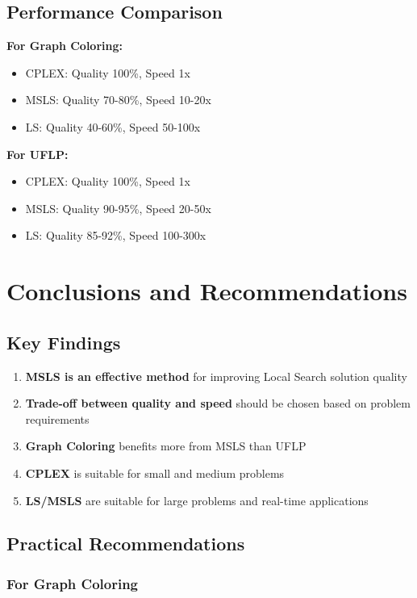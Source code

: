 \documentclass[12pt,a4paper]{article}
\begin{document}
\subsection{Performance Comparison}

\textbf{For Graph Coloring:}
\begin{itemize}
    \item CPLEX: Quality 100\%, Speed 1x
    \item MSLS: Quality 70-80\%, Speed 10-20x
    \item LS: Quality 40-60\%, Speed 50-100x
\end{itemize}

\textbf{For UFLP:}
\begin{itemize}
    \item CPLEX: Quality 100\%, Speed 1x
    \item MSLS: Quality 90-95\%, Speed 20-50x
    \item LS: Quality 85-92\%, Speed 100-300x
\end{itemize}

\section{Conclusions and Recommendations}

\subsection{Key Findings}

\begin{enumerate}
    \item \textbf{MSLS is an effective method} for improving Local Search solution quality
    \item \textbf{Trade-off between quality and speed} should be chosen based on problem requirements
    \item \textbf{Graph Coloring} benefits more from MSLS than UFLP
    \item \textbf{CPLEX} is suitable for small and medium problems
    \item \textbf{LS/MSLS} are suitable for large problems and real-time applications
\end{enumerate}

\subsection{Practical Recommendations}

\subsubsection{For Graph Coloring}
\end{document}
